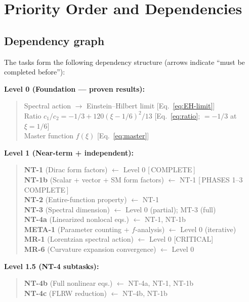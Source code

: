 \documentclass[12pt,a4paper]{article}
\begin{document}
\section{Priority Order and Dependencies}
\label{sec:priority}

\subsection{Dependency graph}

The tasks form the following dependency structure (arrows indicate ``must be
completed before''):

\bigskip
\noindent\textbf{Level 0 (Foundation --- proven results):}
\begin{quote}
  Spectral action $\to$ Einstein--Hilbert limit [Eq.~\eqref{eq:EH-limit}] \\
  Ratio $c_1/c_2 = -1/3 + 120(\xi-1/6)^2/13$ [Eq.~\eqref{eq:ratio}; $= -1/3$ at $\xi = 1/6$] \\
  Master function $f(\xi)$ [Eq.~\eqref{eq:master}]
\end{quote}

\noindent\textbf{Level 1 (Near-term + independent):}
\begin{quote}
  \textbf{NT-1} (Dirac form factors) $\longleftarrow$ Level 0
    \hfill\textcolor{proven}{[\,COMPLETE\,]} \\[2pt]
  \textbf{NT-1b} (Scalar + vector + SM form factors) $\longleftarrow$ NT-1
    \hfill\textcolor{proven}{[\,PHASES 1--3 COMPLETE\,]} \\[2pt]
  \textbf{NT-2} (Entire-function property) $\longleftarrow$ NT-1 \\[2pt]
  \textbf{NT-3} (Spectral dimension) $\longleftarrow$ Level 0 (partial); MT-3 (full) \\[2pt]
  \textbf{NT-4a} (Linearized nonlocal eqs.) $\longleftarrow$ NT-1, NT-1b \\[2pt]
  \textbf{META-1} (Parameter counting + $f$-analysis) $\longleftarrow$ Level 0 (iterative) \\[2pt]
  \textbf{MR-1} (Lorentzian spectral action) $\longleftarrow$ Level 0
    \quad\textcolor{long}{[CRITICAL]} \\[2pt]
  \textbf{MR-6} (Curvature expansion convergence) $\longleftarrow$ Level 0
\end{quote}

\noindent\textbf{Level 1.5 (NT-4 subtasks):}
\begin{quote}
  \textbf{NT-4b} (Full nonlinear eqs.) $\longleftarrow$ NT-4a, NT-1, NT-1b \\[2pt]
  \textbf{NT-4c} (FLRW reduction) $\longleftarrow$ NT-4b, NT-1b
\end{quote}
\end{document}
